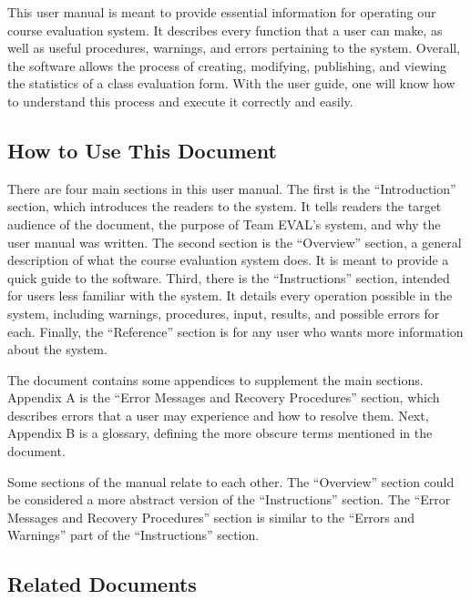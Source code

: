 \documentclass{article}
\begin{document}
This user manual is meant to provide essential information for operating our course evaluation system. It describes every function that a user can make, as well as useful procedures, warnings, and errors pertaining to the system. Overall, the software allows the process of creating, modifying, publishing, and viewing the statistics of a class evaluation form. With the user guide, one will know how to understand this process and execute it correctly and easily.

\subsection{How to Use This Document}

There are four main sections in this user manual. The first is the ``Introduction'' section, which introduces the readers to the system. It tells readers the target audience of the document, the purpose of Team EVAL's system, and why the user manual was written. The second section is the ``Overview'' section, a general description of what the course evaluation system does. It is meant to provide a quick guide to the software. Third, there is the ``Instructions'' section, intended for users less familiar with the system. It details every operation possible in the system, including warnings, procedures, input, results, and possible errors for each. Finally, the ``Reference'' section is for any user who wants more information about the system.

The document contains some appendices to supplement the main sections. Appendix A is the ``Error Messages and Recovery Procedures'' section, which describes errors that a user may experience and how to resolve them. Next, Appendix B is a glossary, defining the more obscure terms mentioned in the document.

Some sections of the manual relate to each other. The ``Overview'' section could be considered a more abstract version of the ``Instructions'' section. The ``Error Messages and Recovery Procedures'' section is similar to the ``Errors and Warnings'' part of the ``Instructions'' section. 

\subsection{Related Documents}
\end{document}
